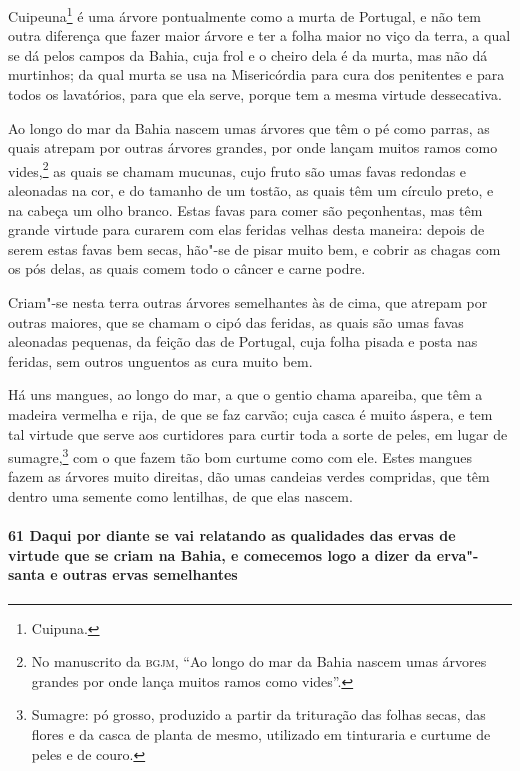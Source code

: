 Cuipeuna\footnote{ Cuipuna.} é uma árvore pontualmente como a murta de Portugal, e não tem
outra diferença que fazer maior árvore e ter a folha maior no viço da terra, a qual se dá
pelos campos da Bahia, cuja frol e o cheiro dela é da murta, mas não dá murtinhos; da qual
murta se usa na Misericórdia para cura dos penitentes e para todos os lavatórios, para que
ela serve, porque tem a mesma virtude dessecativa.

Ao longo do mar da Bahia nascem umas árvores que têm o pé como parras, as quais atrepam
por outras árvores grandes, por onde lançam muitos ramos como vides,\footnote{ No
manuscrito da \textsc{bgjm}, ``Ao longo do mar da Bahia nascem umas árvores grandes por
onde lança muitos ramos como vides''.} as quais se chamam mucunas, cujo fruto são umas
favas redondas e aleonadas na cor, e do tamanho de um tostão, as quais têm um círculo
preto, e na cabeça um olho branco. Estas favas para comer são peçonhentas, mas têm grande
virtude para curarem com elas feridas velhas desta maneira: depois de serem estas favas
bem secas, hão"-se de pisar muito bem, e cobrir as chagas com os pós delas, as quais comem
todo o câncer e carne podre.

Criam"-se nesta terra outras árvores semelhantes às de cima, que atrepam por outras
maiores, que se chamam o cipó das feridas, as quais são umas favas aleonadas pequenas, da
feição das de Portugal, cuja folha pisada e posta nas feridas, sem outros unguentos as
cura muito bem.

Há uns mangues, ao longo do mar, a que o gentio chama apareiba, que têm a madeira vermelha
e rija, de que se faz carvão; cuja casca é muito áspera, e tem tal virtude que serve aos
curtidores para curtir toda a sorte de peles, em lugar de sumagre,\footnote{ Sumagre: pó
grosso, produzido a partir da trituração das folhas secas, das flores e da casca de planta
de mesmo, utilizado em tinturaria e curtume de peles e de couro.} com o que fazem tão bom
curtume como com ele. Estes mangues fazem as árvores
muito direitas, dão umas candeias verdes compridas, que têm
dentro uma semente como lentilhas, de que elas nascem.

\paragraph{61 Daqui por diante se vai relatando as qualidades das ervas de virtude que se
criam na Bahia, e comecemos logo a dizer da erva"-santa e outras ervas semelhantes}

